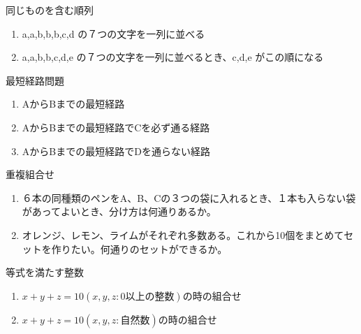 \documentclass[10pt,dvipdfmx]{jsarticle}
\begin{document}
\begin{itembox}[l]{同じものを含む順列}
  \begin{enumerate}
    \item a,a,b,b,b,c,d の７つの文字を一列に並べる
    \item a,a,b,b,c,d,e の７つの文字を一列に並べるとき、c,d,e がこの順になる
  \end{enumerate}
\end{itembox}
\begin{itembox}[l]{最短経路問題}
  \begin{minipage}{0.7\textwidth}
    \begin{enumerate}
      \item AからBまでの最短経路
      \item AからBまでの最短経路でCを必ず通る経路
      \item AからBまでの最短経路でDを通らない経路
    \end{enumerate}
  \end{minipage}
  \begin{minipage}{0.2\textwidth}
  \end{minipage}


\end{itembox}
\begin{itembox}[l]{重複組合せ}
  \begin{enumerate}
    \item ６本の同種類のペンをA、B、Cの３つの袋に入れるとき、１本も入らない袋があってよいとき、分け方は何通りあるか。
    \item オレンジ、レモン、ライムがそれぞれ多数ある。これから10個をまとめてセットを作りたい。何通りのセットができるか。
  \end{enumerate}
\end{itembox}

\begin{itembox}[l]{等式を満たす整数}
  \begin{enumerate}
    \item $x+y+z=10(x,y,z:0以上の整数)$の時の組合せ
    \item $x+y+z=10(x,y,z:自然数)$の時の組合せ
  \end{enumerate}
\end{itembox}
\end{document}
